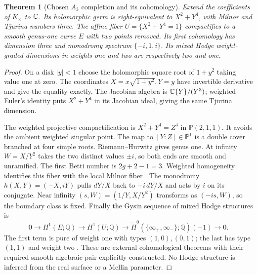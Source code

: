 \documentclass[11pt]{article}
\theoremstyle{readable}
\newtheorem{theorem}{Theorem}[section]
\theoremstyle{remark}\newtheorem{remark}[theorem]{Remark}
\newcommand{\Q}{\mathbb Q}\newcommand{\T}{\mathbb T}
\begin{document}
\begin{theorem}[Chosen $A_3$ completion and its cohomology]
Extend the coefficients of $K_\times$ to $\mathbb C$. Its holomorphic germ is
right-equivalent to $X^2+Y^4$, with Milnor and Tjurina numbers three.
The affine fiber $U=\{X^2+Y^4=1\}$ compactifies to a smooth genus-one
curve $E$ with two points removed. Its first cohomology has dimension three
and monodromy spectrum $\{-i,1,i\}$. Its mixed Hodge weight-graded
dimensions in weights one and two are respectively two and one.
\end{theorem}
\begin{proof}
On a disk $|y|<1$ choose the holomorphic square root of $1+y^2$ taking value
one at zero. The coordinates $X=x\sqrt{1+y^2},Y=y$ have invertible derivative
and give the equality exactly. The Jacobian algebra is
$\mathbb C\{Y\}/(Y^3)$; weighted Euler's identity puts $X^2+Y^4$ in its Jacobian
ideal, giving the same Tjurina dimension.

The weighted projective compactification is
$X^2+Y^4=Z^4$ in $\mathbb P(2,1,1)$. It avoids the ambient weighted
singular point. The map to $[Y:Z]\in\mathbb P^1$ is a double cover
branched at four simple roots. Riemann--Hurwitz gives genus one. At infinity
$W=X/Y^2$ takes the two distinct values $\pm i$, so both ends are smooth
and unramified. The first Betti number is $2g+2-1=3$. Weighted homogeneity
identifies this fiber with the local Milnor fiber \cite{milnor,dimca}.
The monodromy $h(X,Y)=(-X,iY)$ pulls $dY/X$ back to $-i\,dY/X$ and acts
by $i$ on its conjugate. Near infinity $(s,W)=(1/Y,X/Y^2)$ transforms as
$(-is,W)$, so the boundary class is fixed. Finally the Gysin sequence of
mixed Hodge structures is
\[
 0\longrightarrow H^1(E;\Q)\longrightarrow H^1(U;\Q)
 \longrightarrow\widetilde H^0(\{\infty_+,\infty_-\};\Q)(-1)
 \longrightarrow0.
\]
The first term is pure of weight one with types $(1,0),(0,1)$; the last has
type $(1,1)$ and weight two \cite{deligne,peters}. These are external
cohomological theorems with their required smooth algebraic pair explicitly
constructed. No Hodge structure is inferred from the real surface or a
Mellin parameter.
\end{proof}
\end{document}
